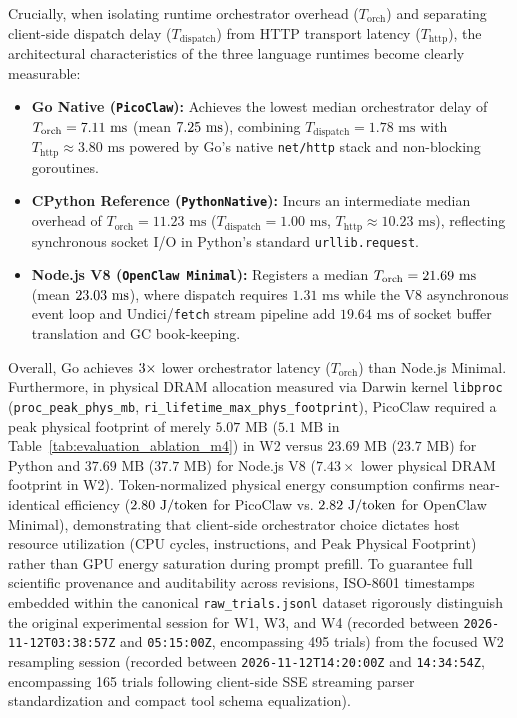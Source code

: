 \documentclass[11pt,a4paper]{article}
\begin{document}
Crucially, when isolating runtime orchestrator overhead ($T_{\text{orch}}$) and separating client-side dispatch delay ($T_{\text{dispatch}}$) from HTTP transport latency ($T_{\text{http}}$), the architectural characteristics of the three language runtimes become clearly measurable:
\begin{itemize}
    \item \textbf{Go Native (\texttt{PicoClaw}):} Achieves the lowest median orchestrator delay of $T_{\text{orch}} = 7.11\text{ ms}$ (mean $7.25\text{ ms}$), combining $T_{\text{dispatch}} = 1.78\text{ ms}$ with $T_{\text{http}} \approx 3.80\text{ ms}$ powered by Go's native \texttt{net/http} stack and non-blocking goroutines.
    \item \textbf{CPython Reference (\texttt{PythonNative}):} Incurs an intermediate median overhead of $T_{\text{orch}} = 11.23\text{ ms}$ ($T_{\text{dispatch}} = 1.00\text{ ms}$, $T_{\text{http}} \approx 10.23\text{ ms}$), reflecting synchronous socket I/O in Python's standard \texttt{urllib.request}.
    \item \textbf{Node.js V8 (\texttt{OpenClaw Minimal}):} Registers a median $T_{\text{orch}} = 21.69\text{ ms}$ (mean $23.03\text{ ms}$), where dispatch requires $1.31\text{ ms}$ while the V8 asynchronous event loop and Undici/\texttt{fetch} stream pipeline add $19.64\text{ ms}$ of socket buffer translation and GC book-keeping.
\end{itemize}
Overall, Go achieves $3\times$ lower orchestrator latency ($T_{\text{orch}}$) than Node.js Minimal. Furthermore, in physical DRAM allocation measured via Darwin kernel \texttt{libproc} (\texttt{proc\_peak\_phys\_mb}, \texttt{ri\_lifetime\_max\_phys\_footprint}), PicoClaw required a peak physical footprint of merely $5.07\text{ MB}$ ($5.1\text{ MB}$ in Table~\ref{tab:evaluation_ablation_m4}) in W2 versus $23.69\text{ MB}$ ($23.7\text{ MB}$) for Python and $37.69\text{ MB}$ ($37.7\text{ MB}$) for Node.js V8 ($7.43\times$ lower physical DRAM footprint in W2). Token-normalized physical energy consumption confirms near-identical efficiency ($2.80\text{ J/token}$ for PicoClaw vs. $2.82\text{ J/token}$ for OpenClaw Minimal), demonstrating that client-side orchestrator choice dictates host resource utilization ($\text{CPU cycles}$, $\text{instructions}$, and $\text{Peak Physical Footprint}$) rather than GPU energy saturation during prompt prefill. To guarantee full scientific provenance and auditability across revisions, ISO-8601 timestamps embedded within the canonical \texttt{raw\_trials.jsonl} dataset rigorously distinguish the original experimental session for W1, W3, and W4 (recorded between \texttt{2026-11-12T03:38:57Z} and \texttt{05:15:00Z}, encompassing 495 trials) from the focused W2 resampling session (recorded between \texttt{2026-11-12T14:20:00Z} and \texttt{14:34:54Z}, encompassing 165 trials following client-side SSE streaming parser standardization and compact tool schema equalization).
\end{document}
